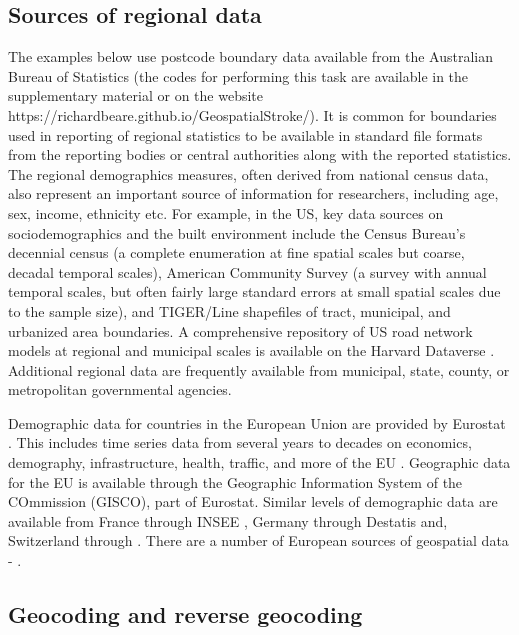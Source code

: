 \documentclass[utf8]{frontiersHLTH}
\begin{document}
\subsection{Sources of regional data}\label{sources-of-regional-data}

The examples below use postcode boundary data available from the
Australian Bureau of Statistics (the codes for performing this task are available in the supplementary material or on the website https://richardbeare.github.io/GeospatialStroke/). It is common for boundaries used in
reporting of regional statistics to be available in standard file
formats from the reporting bodies or central authorities along with
the reported statistics. The regional demographics measures, often
derived from national census data, also represent an important source
of information for researchers, including age, sex, income, ethnicity
etc.  For example, in the US, key data sources on sociodemographics
and the built environment include the Census Bureau's decennial census
\cite{us_census_bureau_decennial} (a complete enumeration at fine
spatial scales but coarse, decadal temporal scales), American
Community Survey\cite{us_census_bureau_acs} (a survey
with annual temporal scales, but often fairly large standard errors at
small spatial scales due to the sample size), and TIGER/Line
shapefiles\cite{us_census_tiger_line} of tract,
municipal, and urbanized area boundaries. A comprehensive repository 
of US road network models at regional and municipal scales is available
on the Harvard Dataverse \cite{boeing_street_2019}. Additional regional 
data are frequently available from municipal, state, county, or 
metropolitan governmental agencies.

Demographic data for countries in the European Union are provided by
Eurostat \cite{eurostat}. This includes time series data from several
years to decades on economics, demography, infrastructure, health,
traffic, and more of the EU \cite{Lahti2017}. Geographic data for the
EU is available through the Geographic Information System of the
COmmission (GISCO), part of Eurostat. Similar levels of demographic
data are available from France through INSEE \cite{insee}, Germany
through Destatis \cite{destatis} and, Switzerland through
\cite{swiss-bfs}. There are a number of European sources of geospatial
data - \cite{diva-gis,germany-gis,swiss-3d}.

\subsection{Geocoding and reverse
geocoding}\label{geocoding-and-reverse-geocoding}
\end{document}
